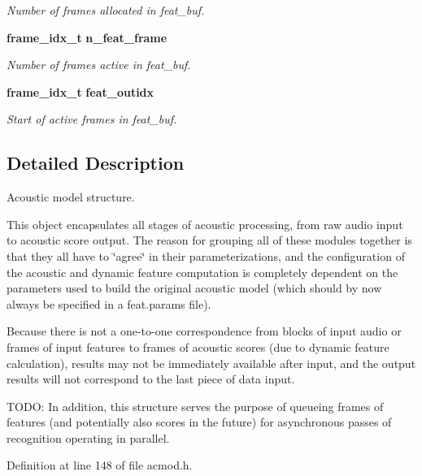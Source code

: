 \begin{DoxyCompactItemize}
\begin{DoxyCompactList}\small\item\em Number of frames allocated in feat\+\_\+buf. \end{DoxyCompactList}\item 
{\bf frame\+\_\+idx\+\_\+t} {\bf n\+\_\+feat\+\_\+frame}\label{structacmod__s_a861cc097befe7e81473f0ae0972186e0}

\begin{DoxyCompactList}\small\item\em Number of frames active in feat\+\_\+buf. \end{DoxyCompactList}\item 
{\bf frame\+\_\+idx\+\_\+t} {\bf feat\+\_\+outidx}\label{structacmod__s_ae15076737bcdcbe1d5b4226f7a0b3f5b}

\begin{DoxyCompactList}\small\item\em Start of active frames in feat\+\_\+buf. \end{DoxyCompactList}\end{DoxyCompactItemize}


\subsection{Detailed Description}
Acoustic model structure. 

This object encapsulates all stages of acoustic processing, from raw audio input to acoustic score output. The reason for grouping all of these modules together is that they all have to \char`\"{}agree\char`\"{} in their parameterizations, and the configuration of the acoustic and dynamic feature computation is completely dependent on the parameters used to build the original acoustic model (which should by now always be specified in a feat.\+params file).

Because there is not a one-\/to-\/one correspondence from blocks of input audio or frames of input features to frames of acoustic scores (due to dynamic feature calculation), results may not be immediately available after input, and the output results will not correspond to the last piece of data input.

T\+O\+D\+O\+: In addition, this structure serves the purpose of queueing frames of features (and potentially also scores in the future) for asynchronous passes of recognition operating in parallel. 

Definition at line 148 of file acmod.\+h.



